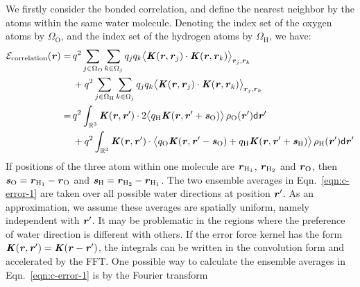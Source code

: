 \documentclass[aps,pre,preprint,unsortedaddress]{revtex4}
\newcommand{\redc}[1]{{\color{red} #1}}
\renewcommand{\v}[1]{\textbf{\textit{#1}}}
\renewcommand{\d}[1]{\textsf{#1}}
\begin{document}
We firstly consider the bonded correlation, and define the nearest
neighbor by the atoms within the same water molecule.  Denoting the
index set of the oxygen atoms by $\Omega_{\textrm{O}}$, and the index
set of the hydrogen atoms by $\Omega_{\textrm{H}}$, we have:
\begin{align}\nonumber
  \mathcal E_{\textrm{correlation}}(\v r)
  = &\,
  q^2\sum_{j\in\Omega_{\textrm{O}}}\sum_{k\in\Omega_j}q_jq_k
  \big\langle
  \v K(\v r , \v r_j)\cdot\v K(\v r , \v r_k)
  \big\rangle_{\v r_j,\v r_k} \\ \nonumber
  &\,+ 
  q^2\sum_{j\in\Omega_{\textrm{H}}}\sum_{k\in\Omega_j}q_jq_k
  \big\langle
  \v K(\v r , \v r_j)\cdot\v K(\v r , \v r_k)
  \big\rangle_{\v r_j,\v r_k} \\\nonumber
  = &\,
  q^2
  \int_{\mathbb R^3}
  \v K(\v r , \v r')\cdot
  2\big\langle
  q_{\textrm{H}}\v K(\v r , \v r' + \v s_{\textrm{O}})
  \big\rangle\,
  \rho_{\textrm{O}}(\v r')
  \d d\v r' \\\label{eqn:c-error-1}
  & \,+
  q^2
  \int_{\mathbb R^3}
  \v K(\v r , \v r')\cdot
  \big\langle
  q_{\textrm{O}}\v K(\v r , \v r' - \v s_{\textrm{O}})+
  q_{\textrm{H}}\v K(\v r , \v r' + \v s_{\textrm{H}})
  \big\rangle\,\rho_{\textrm{H}}(\v r')
  \d d\v r'
\end{align}
If positions of the three atom within one molecule are
$\v r_{\textrm{H}_1}$, $\v r_{\textrm{H}_2}$ and $\v r_{\textrm{O}}$, then
$\v s_{\textrm{O}} = \v r_{\textrm{H}_1} - \v r_{\textrm{O}}$ and
$\v s_{\textrm{H}} = \v r_{\textrm{H}_2} - \v r_{\textrm{H}_1}$.
The two ensemble averages in Eqn.~\eqref{eqn:c-error-1}
\redc{are} taken over all possible water directions 
at position $\v r'$. As an approximation, we
assume these averages are  spatially uniform, namely independent with $\v r'$.
It may be  problematic
in the regions where the preference of water  direction is different
with others.
If the error force kernel
has the form $\v K(\v r , \v r') = \v K(\v r - \v r')$, 
the integrals can be written in the convolution form and accelerated by the FFT.
One possible way to calculate the ensemble averages in
Eqn.~\eqref{eqn:c-error-1} is by the Fourier transform
\end{document}
